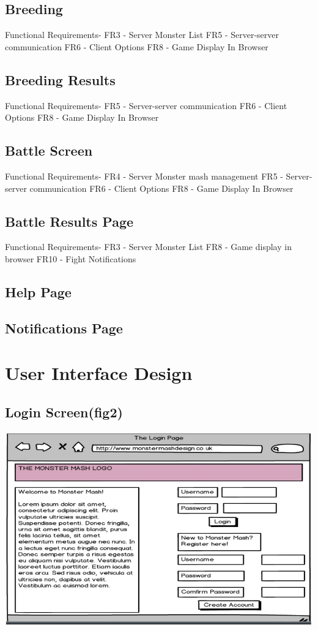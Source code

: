 \documentclass{project}
\begin{document}
\subsection{Breeding}
Functional Requirements-
FR3 - Server Monster List
FR5 - Server-server communication
FR6 - Client Options
FR8 - Game Display In Browser

\subsection{Breeding Results}
Functional Requirements-
FR5 - Server-server communication
FR6 - Client Options
FR8 - Game Display In Browser

\subsection{Battle Screen}
Functional Requirements-
FR4 - Server Monster mash management
FR5 - Server-server communication
FR6 - Client Options
FR8 - Game Display In Browser

\subsection{Battle Results Page}
Functional Requirements-
FR3 - Server Monster List
FR8 - Game display in browser
FR10 - Fight Notifications

\subsection{Help Page}

\subsection{Notifications Page}

\section{User Interface Design}

\subsection{Login Screen(fig2)}
\includegraphics[scale=0.5]{loginPage.jpg}
\end{document}
